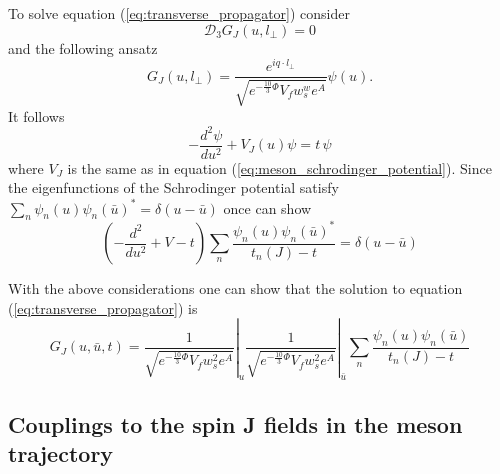 \documentclass[10 pt]{article}
\begin{document}
To solve equation (\ref{eq:transverse_propagator}) consider
\begin{equation}
\mathcal{D}_3 G_J\left(u, l_\perp\right) = 0
\end{equation}
and the following ansatz
\begin{equation}
G_J\left(u, l_\perp\right) = \frac{e^{i q \cdot l_\perp}}{\sqrt{e^{-\frac{10}{3}\Phi}V_f w_s^w e^{A}}} \psi\left(u\right).
\end{equation}
It follows
\begin{equation}
- \frac{d^2 \psi}{d u^2} + V_J \left(u\right) \psi = t \, \psi
\end{equation}
where $V_J$ is the same as in equation (\ref{eq:meson_schrodinger_potential}). Since the eigenfunctions of the Schrodinger potential satisfy $\sum_n \psi_n (u) {\psi_n (\bar{u})}^* = \delta(u - \bar{u})$ once can show
\begin{equation}
\left( - \frac{d^2}{du^2} + V - t \right) \sum_n \frac{\psi_n\left(u\right) {\psi_n\left(\bar{u}\right)}^*}{t_n \left(J\right) - t} = \delta\left(u - \bar{u} \right)
\end{equation}

With the above considerations one can show that the solution to equation (\ref{eq:transverse_propagator}) is
\begin{equation}
G_J \left(u, \bar{u}, t \right) = \left. \frac{1}{\sqrt{e^{-\frac{10}{3}\Phi}V_f w_s^2 e^A}}\right|_u  \left.\frac{1}{\sqrt{e^{-\frac{10}{3}\Phi}V_f w_s^2 e^A}}\right|_{\bar{u}}  \sum_n \frac{\psi_n\left(u\right) \psi_n \left(\bar{u}\right)}{t_n\left(J\right) - t}
\end{equation}

\subsection{Couplings to the spin J fields in the meson trajectory}
\end{document}
